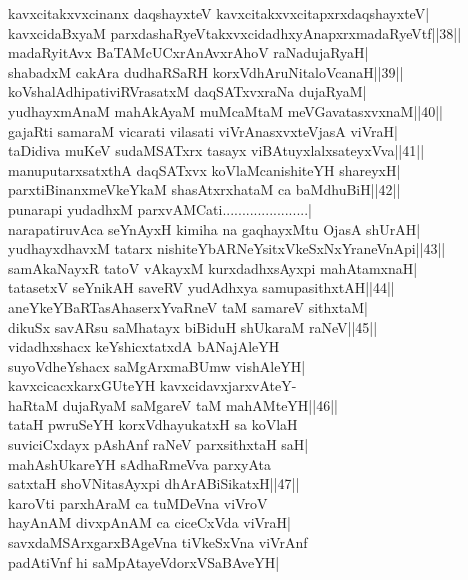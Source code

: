 \documentclass{article}
\begin{document}
kavxcitakxvxcinanx daqshayxteV kavxcitakxvxcitapxrxdaqshayxteV|\\
kavxcidaBxyaM parxdashaRyeVtakxvxcidadhxyAnapxrxmadaRyeVtf||38||\\
madaRyitAvx BaTAMcUCxrAnAvxrAhoV raNadujaRyaH|\\
shabadxM cakAra dudhaRSaRH korxVdhAruNitaloVcanaH||39||\\
koVshalAdhipativiRVrasatxM daqSATxvxraNa dujaRyaM|\\
yudhayxmAnaM mahAkAyaM muMcaMtaM meVGavatasxvxnaM||40||\\
gajaRti samaraM vicarati vilasati viVrAnasxvxteVjasA viVraH|\\
taDidiva muKeV sudaMSATxrx tasayx viBAtuyxlalxsateyxVva||41||\\
manuputarxsatxthA daqSATxvx koVlaMcanishiteYH shareyxH|\\
parxtiBinanxmeVkeYkaM shasAtxrxhataM ca baMdhuBiH||42||\\
punarapi yudadhxM parxvAMCati......................|\\
narapatiruvAca seYnAyxH kimiha na gaqhayxMtu OjasA shUrAH|\\
yudhayxdhavxM tatarx nishiteYbARNeYsitxVkeSxNxYraneVnApi||43||\\
samAkaNayxR tatoV vAkayxM kurxdadhxsAyxpi mahAtamxnaH|\\
tatasetxV seYnikAH saveRV yudAdhxya samupasithxtAH||44||\\
aneYkeYBaRTasAhaserxYvaRneV taM samareV sithxtaM|\\
dikuSx savARsu saMhatayx biBiduH shUkaraM raNeV||45||\\
vidadhxshacx keYshicxtatxdA bANajAleYH\\
suyoVdheYshacx saMgArxmaBUmw vishAleYH|\\
kavxcicacxkarxGUteYH kavxcidavxjarxvAteY-\\
haRtaM dujaRyaM saMgareV taM mahAMteYH||46||\\
tataH pwruSeYH korxVdhayukatxH sa koVlaH\\
suviciCxdayx pAshAnf raNeV parxsithxtaH saH|\\
mahAshUkareYH sAdhaRmeVva parxyAta\\
satxtaH shoVNitasAyxpi dhArABiSikatxH||47||\\
karoVti parxhAraM ca tuMDeVna viVroV\\
hayAnAM divxpAnAM ca ciceCxVda viVraH|\\
savxdaMSArxgarxBAgeVna tiVkeSxVna viVrAnf\\
padAtiVnf hi saMpAtayeVdorxVSaBAveYH|\\
\end{document}
